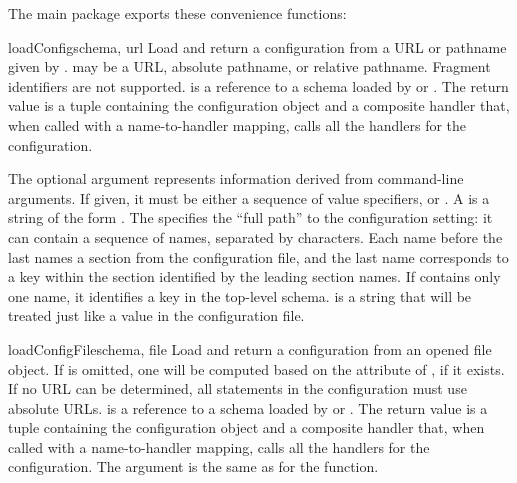 \documentclass{howto}
\begin{document}

The main  package exports these convenience functions:

\begin{funcdesc}{loadConfig}{schema, url}
  Load and return a configuration from a URL or pathname given by
  .   may be a URL, absolute pathname, or relative
  pathname.  Fragment identifiers are not supported.   is
  a reference to a schema loaded by  or
  .
  The return value is a tuple containing the configuration object and
  a composite handler that, when called with a name-to-handler
  mapping, calls all the handlers for the configuration.

  The optional  argument represents information derived
  from command-line arguments.  If given, it must be either a sequence
  of value specifiers, or .  A  is a
  string of the form .  The
   specifies the ``full path'' to the configuration
  setting: it can contain a sequence of names, separated by
  \character{/} characters. Each name before the last names a section
  from the configuration file, and the last name corresponds to a key
  within the section identified by the leading section names.  If
   contains only one name, it identifies a key in the
  top-level schema.   is a string that will be treated
  just like a value in the configuration file.
\end{funcdesc}

\begin{funcdesc}{loadConfigFile}{schema, file}
  Load and return a configuration from an opened file object.  If
   is omitted, one will be computed based on the
   attribute of , if it exists.  If no URL can
  be determined, all  statements in the
  configuration must use absolute URLs.   is a reference
  to a schema loaded by  or
  .
  The return value is a tuple containing the configuration object and
  a composite handler that, when called with a name-to-handler
  mapping, calls all the handlers for the configuration.
  The  argument is the same as for the
   function.
\end{funcdesc}
\end{document}
